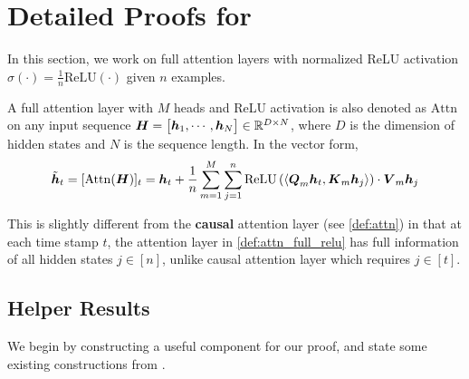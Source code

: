 \clearpage
\section{Detailed Proofs for  } \label{app:mechanism}
In this section, we work on full attention layers with normalized ReLU activation $\sigma(\cdot) = \frac{1}{n} \mathrm{ReLU}(\cdot)$ given $n$ examples. 
\begin{definition}
\label{def:attn_full_relu}
    A full attention layer with $M$ heads and ReLU activation is also denoted as $\mathrm{Attn}$ on any input sequence $\boldsymbol{H} = \begin{bmatrix}
        \boldsymbol{h}_1, \cdots, \boldsymbol{h}_N
    \end{bmatrix} \in \mathbb R^{D \times N}$, where $D$ is the dimension of hidden states and $N$ is the sequence length. In the vector form,
    \begin{equation}
         \tilde{\boldsymbol{h}}_t = [\mathrm{Attn}(\boldsymbol{H})]_t = \boldsymbol{h}_t +  \frac{1}{n} \sum_{m=1}^M \sum_{j=1}^n \mathrm{ReLU} \left(\left\langle {\boldsymbol{Q}_m \boldsymbol{h}_t, \boldsymbol{K}_m \boldsymbol{h}_j} \right\rangle\right) \cdot \boldsymbol{V}_m \boldsymbol{h}_j
    \end{equation}
\end{definition}
\begin{remark}
    This is slightly different from the \textbf{causal} attention layer (see \cref{def:attn}) in that at each time stamp $t$, the attention layer in \cref{def:attn_full_relu} has full information of all hidden states $j \in [n]$, unlike causal attention layer which requires $j \in [t]$. 
\end{remark}


\subsection{Helper Results}

We begin by constructing a useful component for our proof, and state some existing constructions from \citet{Akyrek2022WhatLA}.


